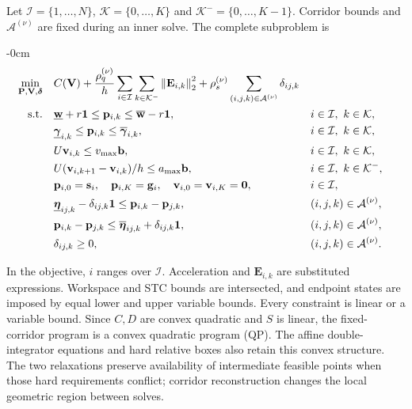 Let $\mathcal I=\{1,\ldots,N\}$, $\mathcal K=\{0,\ldots,K\}$ and $\mathcal K^-=\{0,\ldots,K-1\}$. Corridor bounds and $\mathcal A^{(\nu)}$ are fixed during an inner solve. The complete subproblem is
\begin{adjustwidth}{-\extralength}{0cm}
\begin{subequations}\label{eq:subproblem}\begin{align}
 \min_{\mathbf P,\mathbf V,\boldsymbol\delta}\quad&
 C(\mathbf V)
 +\frac{\rho_q^{(\nu)}}h\sum_{i\in\mathcal I}\sum_{k\in\mathcal K^-}\left\lVert \mathbf E_{i,k}\right\rVert_2^2
 +\rho_s^{(\nu)}\sum_{(i,j,k)\in\mathcal A^{(\nu)}}\delta_{ij,k}
 \label{eq:nlpobjective}\\
 \mathrm{s.t.}\quad&
 \underline{\mathbf w}+r\mathbf{1}\leq\mathbf{p}_{i,k}\leq\overline{\mathbf w}-r\mathbf{1},
 && i\in\mathcal I,\ k\in\mathcal K,\label{eq:nlpworkspace}\\
 &\underline{\boldsymbol\gamma}_{i,k}\leq\mathbf{p}_{i,k}\leq\overline{\boldsymbol\gamma}_{i,k},
 &&i\in\mathcal I,\ k\in\mathcal K,\label{eq:nlpstc}\\
 &U\mathbf{v}_{i,k}\leq v_{\max}\mathbf b,
 &&i\in\mathcal I,\ k\in\mathcal K,\label{eq:nlpvelocity}\\
 &U(\mathbf{v}_{i,k+1}-\mathbf{v}_{i,k})/h\leq a_{\max}\mathbf b,
 &&i\in\mathcal I,\ k\in\mathcal K^-,\label{eq:nlpacceleration}\\
 &\mathbf{p}_{i,0}=\mathbf s_i,\quad\mathbf{p}_{i,K}=\mathbf g_i,\quad
 \mathbf{v}_{i,0}=\mathbf{v}_{i,K}=\mathbf0,
 &&i\in\mathcal I,\label{eq:nlpboundary}\\
 &\underline{\boldsymbol\eta}_{ij,k}-\delta_{ij,k}\mathbf{1}
 \leq\mathbf{p}_{i,k}-\mathbf{p}_{j,k},
 &&(i,j,k)\in\mathcal A^{(\nu)},\label{eq:nlprellower}\\
 &\mathbf{p}_{i,k}-\mathbf{p}_{j,k}\leq\overline{\boldsymbol\eta}_{ij,k}+\delta_{ij,k}\mathbf{1},
 &&(i,j,k)\in\mathcal A^{(\nu)},\label{eq:nlprelupper}\\
 &\delta_{ij,k}\geq0,
 &&(i,j,k)\in\mathcal A^{(\nu)}.\label{eq:nlpslack}
\end{align}\end{subequations}
\end{adjustwidth}
In the objective, $i$ ranges over $\mathcal I$. Acceleration and $\mathbf E_{i,k}$ are substituted expressions. Workspace and STC bounds are intersected, and endpoint states are imposed by equal lower and upper variable bounds. Every constraint is linear or a variable bound. Since $C,D$ are convex quadratic and $S$ is linear, the fixed-corridor program is a convex quadratic program (QP). The affine double-integrator equations and hard relative boxes also retain this convex structure. The two relaxations preserve availability of intermediate feasible points when those hard requirements conflict; corridor reconstruction changes the local geometric region between solves.

